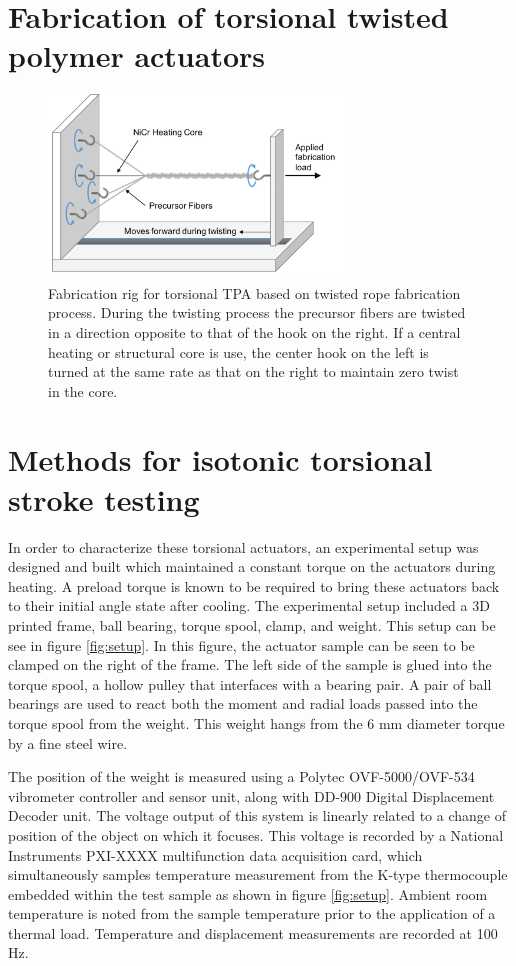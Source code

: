 \documentclass[twocolumn,10pt]{asme2e}
\begin{document}
\section{Fabrication of torsional twisted polymer actuators}

\begin{figure}
    \centering
        \includegraphics[width=8cm]{../Images/coiling_rig.pdf}
        \caption{Fabrication rig for torsional TPA based on twisted rope fabrication process. During the twisting process the precursor fibers are twisted in a direction opposite to that of the hook on the right. If a central heating or structural core is use, the center hook on the left is turned at the same rate as that on the right to maintain zero twist in the core. }
        \label{fig:coiled}
\end{figure}

\section{Methods for isotonic torsional stroke testing}
In order to characterize these torsional actuators, an experimental setup was designed and built which maintained a constant torque on the actuators during heating. A preload torque is known to be required to bring these actuators back to their initial angle state after cooling. The experimental setup included a 3D printed frame, ball bearing, torque spool, clamp, and weight. This setup can be see in figure \ref{fig:setup}. In this figure, the actuator sample can be seen to be clamped on the right of the frame. The left side of the sample is glued into the torque spool, a hollow pulley that interfaces with a bearing pair. A pair of ball bearings are used to react both the moment and radial loads passed into the torque spool from the weight. This weight hangs from the 6 mm diameter torque by a fine steel wire. 

The position of the weight is measured using a Polytec OVF-5000/OVF-534 vibrometer controller and sensor unit, along with DD-900 Digital Displacement Decoder unit. The voltage output of this system is linearly related to a change of position of the object on which it focuses. This voltage is recorded by a National Instruments PXI-XXXX multifunction data acquisition card, which simultaneously samples temperature measurement from the K-type thermocouple embedded within the test sample as shown in figure \ref{fig:setup}. Ambient room temperature is noted from the sample temperature prior to the application of a thermal load. Temperature and displacement measurements are recorded at 100 Hz. 
\end{document}
